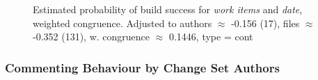 \begin{figure}[b]
{     \label{subfig:prob_weighted_workitems_age_q100}
  }
  \caption{Estimated probability of build success for \emph{work items} and \emph{date}, weighted congruence. Adjusted to authors $\approx$ -0.156 (17), files $\approx$ -0.352 (131), w. congruence $\approx$ 0.1446, type = cont}
  \label{fig:weighted_congruence_workitems_age}
\end{figure}



\subsubsection{Commenting Behaviour by Change Set Authors}
\label{sec:commenting}

